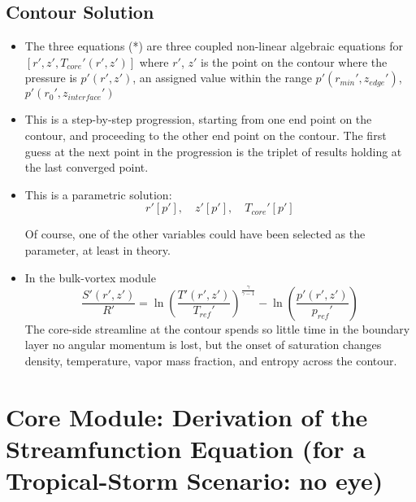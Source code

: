 \documentclass[preprint, prX]{revtex4}
\newcommand{\gogmo}{\frac{\gamma}{\gamma-1}}
\newcommand{\pfrac}[2]{\left(\frac{#1}{#2}\right)}
\begin{document}
\subsection{Contour Solution}

\begin{itemize}
\item The three equations (*) are three coupled non-linear algebraic equations for $[r',z', T_{core}'(r',z')]$ where $r'$, $z'$ is the point on the contour where the pressure is $p'(r',z')$, an assigned value within the range $p'(r_{min}', z_{edge}')$, $p'(r_0', z_{interface}')$

\item This is a step-by-step progression, starting from one end point on the contour, and proceeding  to the other end point on the contour. The first guess at the next point in the progression is the triplet of results holding at the last converged point.

\item This is a parametric solution:
\begin{equation}
	r'[p'], \quad z'[p'], \quad  T_{core}'[p']
\end{equation}

Of course, one of the other variables could have been selected as the parameter, at least in theory.

\item In the bulk-vortex module
\begin{equation}
	\frac{S'(r',z')}{R'} = \ln  \pfrac{T'(r',z')}{T_{ref}'} ^\gogmo - \ln  \pfrac{p'(r',z')}{p_{ref}'}
\end{equation}
The core-side streamline at the contour spends so little time in the boundary layer no angular momentum is lost, but the onset of saturation changes density, temperature, vapor mass fraction, and entropy across the contour.
\end{itemize}

\section{Core Module: Derivation of the Streamfunction Equation (for a Tropical-Storm Scenario: no eye)}
\end{document}
